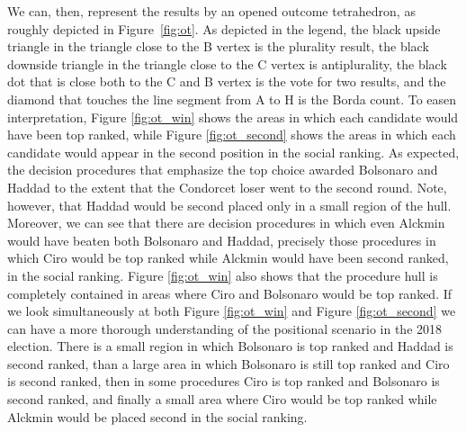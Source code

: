 \documentclass[hidelinks,11pt]{article} \usepackage[utf8]{inputenc}
\begin{document}



We can, then, represent the results by an opened outcome tetrahedron, as roughly
depicted in Figure~\ref{fig:ot}. As depicted in the legend, the black upside
triangle in the triangle close to the B vertex is the plurality result, the
black downside triangle in the triangle close to the C vertex is antiplurality,
the black dot that is close both to the C and B vertex is the vote for two
results, and the diamond that touches the line segment from A to H is the Borda
count. To easen interpretation, Figure \ref{fig:ot_win} shows the areas in which
each candidate would have been top ranked, while Figure \ref{fig:ot_second}
shows the areas in which each candidate would appear in the second position in
the social ranking. As expected, the decision procedures that emphasize the top
choice awarded Bolsonaro and Haddad to the extent that the Condorcet loser went
to the second round. Note, however, that Haddad would be second placed only in a
small region of the hull. Moreover, we can see that there are decision
procedures in which even Alckmin would have beaten both Bolsonaro and Haddad,
precisely those procedures in which Ciro would be top ranked while Alckmin would
have been second ranked, in the social ranking. Figure \ref{fig:ot_win} also
shows that the procedure hull is completely contained in areas where Ciro and
Bolsonaro would be top ranked. If we look simultaneously at both Figure
\ref{fig:ot_win} and Figure \ref{fig:ot_second} we can have a more thorough
understanding of the positional scenario in the 2018 election. There is a small
region in which Bolsonaro is top ranked and Haddad is second ranked, than a
large area in which Bolsonaro is still top ranked and Ciro is second ranked,
then in some procedures Ciro is top ranked and Bolsonaro is second ranked, and
finally a small area where Ciro would be top ranked while Alckmin would be
placed second in the social ranking.

\end{document}
